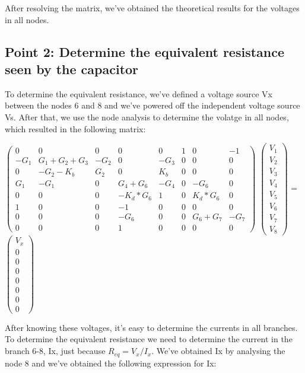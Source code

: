 After resolving the matrix, we've obtained the theoretical results for the voltages in all nodes. 

\subsection{Point 2: Determine the equivalent resistance seen by the capacitor}

\setlength{\parskip}{1em}

To determine the equivalent resistance, we've defined a voltage source Vx between the nodes 6 and 8 and we've powered off the independent voltage source Vs. After that, we use the node analysis to determine the volatge in all nodes, which resulted in the following matrix:

\setlength{\parskip}{4em}

$\begin{pmatrix}
0 & 0 & 0 & 0 & 0 & 1 & 0 & -1\\
-G_1 & G_1+G_2+G_3 & -G_2 & 0 & -G_3 & 0 & 0 & 0\\
0 & -G_2-K_b & G_2 & 0 & K_b & 0 & 0 & 0 \\
G_1 & -G_1 & 0 & G_4+G_6 & -G_4 & 0 & -G_6 & 0\\
0 & 0 & 0 & -K_d*G_6 & 1 & 0 & K_d*G_6 & 0 \\
1 & 0 & 0 & -1 & 0 & 0 & 0 & 0\\
0 & 0 & 0 & -G_6 & 0 & 0 & G_6+G_7 & -G_7  \\ 
0 & 0 & 0 & 1 & 0 & 0 & 0 & 0
\end{pmatrix}$
$\begin{pmatrix}
V_1\\
V_2\\
V_3\\
V_4\\
V_5\\
V_6\\
V_7\\
V_8
\end{pmatrix}$
=
$\begin{pmatrix}
V_x\\
0\\
0\\
0\\
0\\
0\\
0\\
0
\end{pmatrix}$

After knowing these voltages, it's easy to determine the currents in all branches. To determine the equivalent resistance we need to determine the current in the branch 6-8, Ix, just because $R_{eq}=V_{x}/I_{x}$. We've obtained Ix by analysing the node 8 and we've obtained the following expression for Ix:

